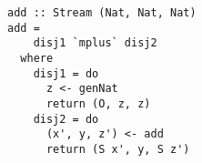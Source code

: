 \begin{figure}[!t]
  \centering
  \begin{minipage}{\columnwidth}
    \begin{lstlisting}[label={add_all}, caption={Function for \lstinline{addo out out out} direction}, captionpos=b, frame=tb]
add :: Stream (Nat, Nat, Nat)
add =
    disj1 `mplus` disj2
  where
    disj1 = do
      z <- genNat
      return (O, z, z)
    disj2 = do
      (x', y, z') <- add
      return (S x', y, S z')
    \end{lstlisting}
  \end{minipage}
\end{figure}